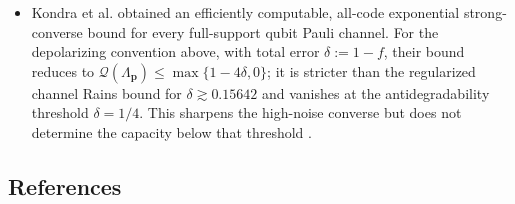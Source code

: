 \begin{itemize}
  \item Kondra et al. obtained an efficiently computable, all-code
  exponential strong-converse bound for every full-support qubit Pauli
  channel.  For the depolarizing convention above, with total error
  $\delta:=1-f$, their bound reduces to
  $\mathcal Q(\Lambda_{\mathbf p})\le\max\{1-4\delta,0\}$; it is stricter
  than the regularized channel Rains bound for $\delta\gtrsim0.15642$ and
  vanishes at the antidegradability threshold $\delta=1/4$.  This sharpens
  the high-noise converse but does not determine the capacity below that
  threshold .
\end{itemize}

\subsection*{References}

